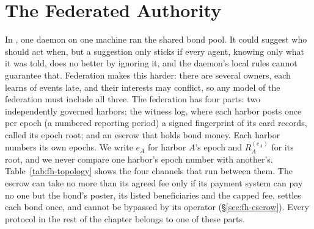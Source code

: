 \documentclass[11pt,a4paper]{article}
\theoremstyle{definition}
\theoremstyle{remark}
\begin{document}
\section{The Federated Authority}\label{sec:fh-authority}
In , one daemon on one machine ran the shared bond pool. It could suggest who should act when, but a suggestion only sticks if every agent, knowing only what it was told, does no better by ignoring it, and the daemon's local rules cannot guarantee that. Federation makes this harder: there are several owners, each learns of events late, and their interests may conflict, so any model of the federation must include all three.
The federation has four parts: two independently governed harbors; the witness log, where each harbor posts once per epoch (a numbered reporting period) a signed fingerprint of its card records, called its epoch root; and an escrow that holds bond money. Each harbor numbers its own epochs. We write $e_A$ for harbor $A$'s epoch and $R_A^{(e_A)}$ for its root, and we never compare one harbor's epoch number with another's. Table~\ref{tab:fh-topology} shows the four channels that run between them. The escrow can take no more than its agreed fee only if its payment system can pay no one but the bond's poster, its listed beneficiaries and the capped fee, settles each bond once, and cannot be bypassed by its operator (\S\ref{sec:fh-escrow}). Every protocol in the rest of the chapter belongs to one of these parts.

\end{document}
